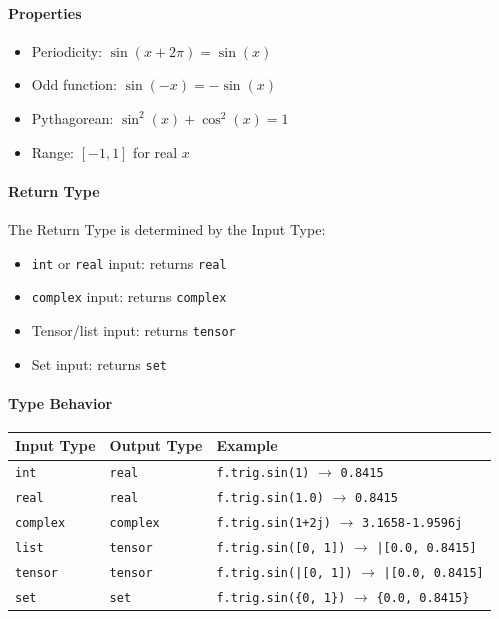\paragraph{Properties}
\begin{itemize}
\item Periodicity: $\sin(x + 2\pi) = \sin(x)$
\item Odd function: $\sin(-x) = -\sin(x)$
\item Pythagorean: $\sin^2(x) + \cos^2(x) = 1$
\item Range: $[-1, 1]$ for real $x$
\end{itemize}

\paragraph{Return Type}
The Return Type is determined by the Input Type:
\begin{itemize}
\item \texttt{int} or \texttt{real} input: returns \texttt{real}
\item \texttt{complex} input: returns \texttt{complex}
\item Tensor/list input: returns \texttt{tensor}
\item Set input: returns \texttt{set}
\end{itemize}

\paragraph{Type Behavior}
\begin{center}
\begin{tabular}{lll}
\textbf{Input Type} & \textbf{Output Type} & \textbf{Example} \\ \hline
\texttt{int} & \texttt{real} & \texttt{f.trig.sin(1)} $\to$ \texttt{0.8415} \\
\texttt{real} & \texttt{real} & \texttt{f.trig.sin(1.0)} $\to$ \texttt{0.8415} \\
\texttt{complex} & \texttt{complex} & \texttt{f.trig.sin(1+2j)} $\to$ \texttt{3.1658-1.9596j} \\
\texttt{list} & \texttt{tensor} & \texttt{f.trig.sin([0, 1])} $\to$ \texttt{|[0.0, 0.8415]} \\
\texttt{tensor} & \texttt{tensor} & \texttt{f.trig.sin(|[0, 1])} $\to$ \texttt{|[0.0, 0.8415]} \\
\texttt{set} & \texttt{set} & \texttt{f.trig.sin(\{0, 1\})} $\to$ \texttt{\{0.0, 0.8415\}} \\
\end{tabular}
\end{center}

